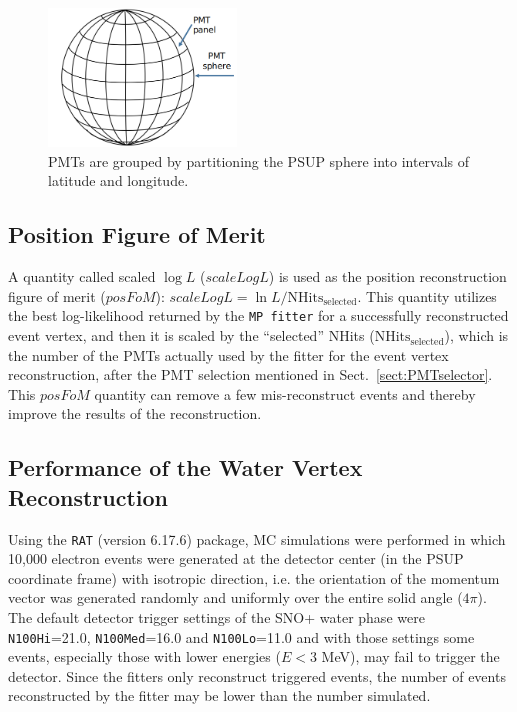 	\begin{figure}[!htb]
	\centering
	\includegraphics[width=5cm]{GroupPMTs.png}
	\caption{PMTs are grouped by partitioning the PSUP sphere into intervals of latitude and longitude.}
	\label{GroupPMTs}
   \end{figure}

\subsection{Position Figure of Merit}\label{sect:positionFoM}

A quantity called scaled $\log L$ ($scaleLogL$) is used as the position reconstruction figure of merit ($posFoM$): $scaleLogL = \ln L/\mathrm{NHits}_\mathrm{selected}$. This quantity utilizes the best log-likelihood returned by the \texttt{MP fitter} for a successfully reconstructed event vertex, and then it is scaled by the ``selected'' NHits ($\mathrm{NHits}_\mathrm{selected}$), which is the number of the PMTs actually used by the fitter for the event vertex reconstruction, after the PMT selection mentioned in Sect.~\ref{sect:PMTselector}. This $posFoM$ quantity can remove a few mis-reconstruct events and thereby improve the results of the reconstruction.

\subsection{Performance of the Water Vertex Reconstruction}\label{sect:waterFitterVertex}

Using the \texttt{RAT} (version 6.17.6) package, MC simulations were performed in which 10,000 electron events were generated at the detector center (in the PSUP coordinate frame) with isotropic direction, i.e. the orientation of the momentum vector was generated randomly and uniformly over the entire solid angle ($4\pi$). The default detector trigger settings of the SNO+ water phase were \texttt{N100Hi}=21.0, \texttt{N100Med}=16.0 and \texttt{N100Lo}=11.0 and with those settings some events, especially those with lower energies ($E<3$ MeV), may fail to trigger the detector. Since the fitters only reconstruct triggered events, the number of events reconstructed by the fitter may be lower than the number simulated.

